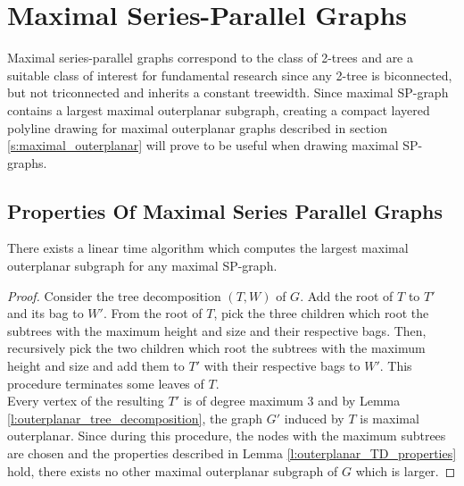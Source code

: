 \section{Maximal Series-Parallel Graphs}\label{section:SP-graphs}

Maximal series-parallel graphs correspond to the class of 2-trees \cite[P. 2]{straight-line_2-trees} and are a suitable class of interest for fundamental research since any 2-tree is biconnected, but not triconnected and inherits a constant treewidth. Since maximal SP-graph contains a largest maximal outerplanar subgraph, creating a compact layered polyline drawing for maximal outerplanar graphs described in section \ref{s:maximal_outerplanar} will prove to be useful when drawing maximal SP-graphs. 

\subsection{Properties Of Maximal Series Parallel Graphs}


\begin{lemma}
	There exists a linear time algorithm which computes the largest maximal outerplanar subgraph for any maximal SP-graph.
\end{lemma}
\begin{proof}
	Consider the tree decomposition $(T,W)$ of $G$. Add the root of $T$ to $T'$ and its bag to $W'$. From the root of $T$, pick the three children which root the subtrees with the maximum height and size and their respective bags. Then, recursively pick the two children which root the subtrees with the maximum height and size and add them to $T'$ with their respective bags to $W'$. This procedure terminates some leaves of $T$.\\
	Every vertex of the resulting $T'$ is of degree maximum 3 and by Lemma \ref{l:outerplanar_tree_decomposition}, the graph $G'$ induced by $T$ is maximal outerplanar. Since during this procedure, the nodes with the maximum subtrees are chosen and the properties described in Lemma \ref{l:outerplanar_TD_properties} hold, there exists no other maximal outerplanar subgraph of $G$ which is larger. 
\end{proof}

